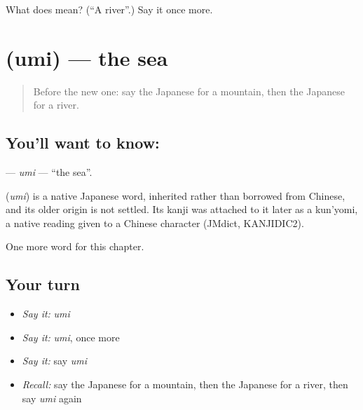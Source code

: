 \begin{tcolorbox}[breakable,colback=teal!4,colframe=teal!35!black,title={Before you move on}]
What does  mean? (\textquotedblleft{}A river\textquotedblright{}.) Say it once more.
\end{tcolorbox}
\section[\texorpdfstring{\ja{うみ} (umi)}{うみ (umi)}]{ (umi) — the sea}

\label{lesson:JA-C42-umi}



\begin{quote}
Before the new one: say the Japanese for a mountain, then the Japanese for a river.
\end{quote}

\subsection*{You'll want to know: }
\textbf{} — \emph{umi} — \textquotedblleft{}the sea\textquotedblright{}.

\begin{cousinweb}
\textbf{} (\emph{umi}) is a native Japanese word, inherited rather than borrowed from Chinese, and its older origin is not settled. Its kanji was attached to it later as a kun'yomi, a native reading given to a Chinese character (JMdict, KANJIDIC2).
\end{cousinweb}

\begin{grammarlens}[title={What you've built}]
One more word for this chapter.
\end{grammarlens}

\subsection*{Your turn}
\begin{itemize}
\raggedright
  \item \emph{Say it:} \emph{umi}
  \item \emph{Say it:} \emph{umi}, once more
  \item \emph{Say it:} say \emph{umi}
  \item \emph{Recall:} say the Japanese for a mountain, then the Japanese for a river, then say \emph{umi} again
\end{itemize}

